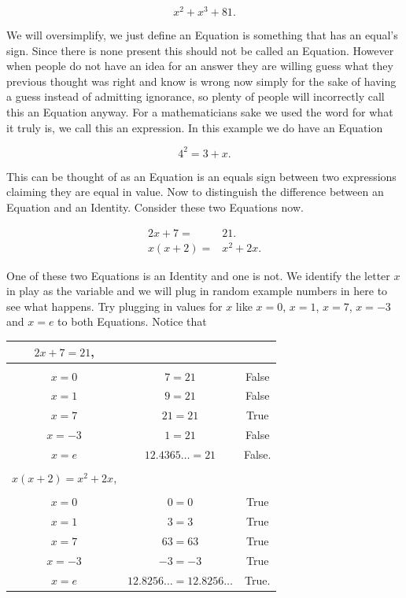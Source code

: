 \documentclass[12pt]{article}
\begin{document}
\begin{equation*}
    x^2+x^3+81.
\end{equation*}

We will oversimplify, we just define an Equation is something that has an equal's sign. Since there is none present this should not be called an Equation. However when people do not have an idea for an answer they are willing guess what they previous thought was right and know is wrong now simply for the sake of having a guess instead of admitting ignorance, so plenty of people will incorrectly call this an Equation anyway. For a mathematicians sake we used the word for what it truly is, we call this an expression. In this example we do have an Equation

\begin{equation*}
    4^2=3+x.
\end{equation*}

This can be thought of as an Equation is an equals sign between two expressions claiming they are equal in value. Now to distinguish the difference between an Equation and an Identity. Consider these two Equations now.
 
\begin{align*}
    2x+7=&21. \\
    x(x+2)=&x^2+2x.
\end{align*}

One of these two Equations is an Identity and one is not. We identify the letter $x$ in play as the variable and we will plug in random example numbers in here to see what happens. Try plugging in values for $x$ like $x=0$, $x=1$, $x=7$, $x=-3$ and $x=e$ to both Equations. Notice that \\

\vspace{10pt}

\begin{tabular}{c c c}
    $2x+7=21$, & & \\
    \hline \\
    $x=0$ & $7=21$ & False \\
    $x=1$ & $9=21$ & False \\
    $x=7$ & $21=21$ & True \\
    $x=-3$ & $1=21$ & False \\
    $x=e$ &  $12.4365\ldots=21$ & False. \\
    & & \\
    $x(x+2)=x^2+2x$, & & \\
    \hline \\
    $x=0$ & $0=0$ & True \\
    $x=1$ & $3=3$ & True \\
    $x=7$ & $63=63$ & True \\
    $x=-3$ & $-3=-3$ & True \\
    $x=e$ & $12.8256\ldots=12.8256\ldots$ & True. \\
\end{tabular}
\end{document}
